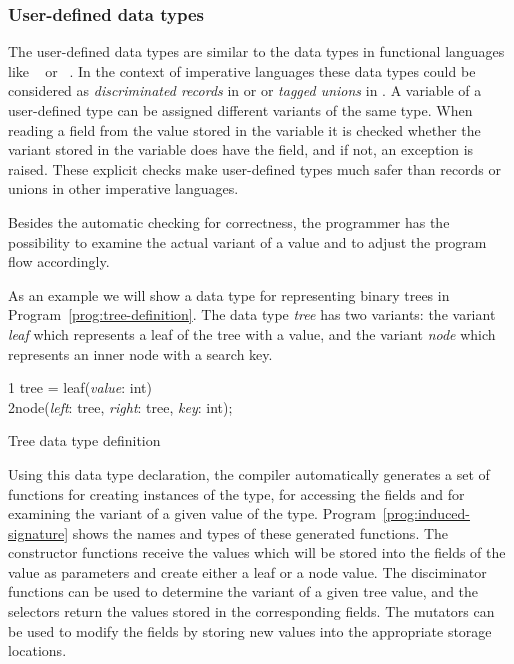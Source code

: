 \subsubsection{User-defined data types}

%
The user-defined data types are similar to the data types in
functional languages like \haskell{}~\cite{peytonjones98haskell98} or
\mllanguage{}~\cite{milner97sml}.  In the context of imperative
languages these data types could be considered as {\em discriminated
  records} in \pascal{} or \modula{} or {\em tagged unions} in \cee{}.
A variable of a user-defined type can be assigned different variants
of the same type.  When reading a field from the value stored in the
variable it is checked whether the variant stored in the variable does
have the field, and if not, an exception is raised.  These explicit
checks make user-defined types much safer than records or unions in
other imperative languages.

Besides the automatic checking for correctness, the programmer has the
possibility to examine the actual variant of a value and to adjust the
program flow accordingly.

As an example we will show a data type for representing binary trees
in Program~\ref{prog:tree-definition}.  The data type {\em tree} has
two variants: the variant {\em leaf} which represents a leaf of the
tree with a value, and the variant {\em node} which represents an
inner node with a search key.

\begin{Program}
\begin{ttlprog}
1\>\ttlDatatype{} tree = \>\>\>\>\>\>\>\>leaf({\em value}: int) \ttlOr{}\\
2\>\>\>\>\>\>\>\>\>node({\em left}: tree, {\em right}: tree, {\em key}: int);
\end{ttlprog}
\caption{Tree data type definition}
\label{prog:tree-definition}
\end{Program}

Using this data type declaration, the \turtle{} compiler automatically
generates a set of functions for creating instances of the type, for
accessing the fields and for examining the variant of a given value of
the type.  Program~\ref{prog:induced-signature} shows the names and
types of these generated functions.  The constructor functions receive
the values which will be stored into the fields of the value as
parameters and create either a leaf or a node value.  The disciminator
functions can be used to determine the variant of a given tree value,
and the selectors return the values stored in the corresponding
fields.  The mutators can be used to modify the fields by storing new
values into the appropriate storage locations.

